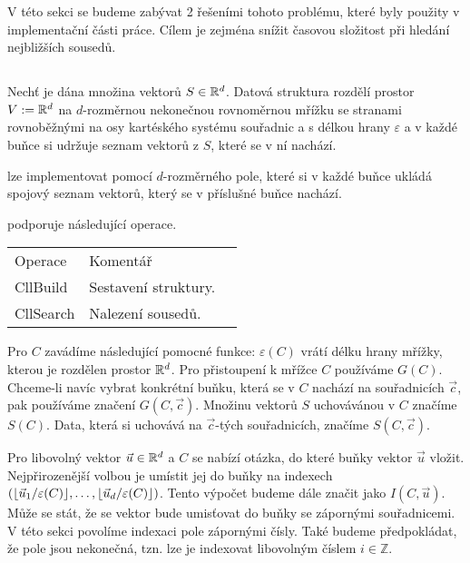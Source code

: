 V této sekci se budeme zabývat 2 řešeními tohoto problému, které byly použity v implementační části práce. Cílem je zejména snížit časovou složitost při hledání nejbližších sousedů.

\subsection{}

\label{defi:cll}
\begin{defi}
  Nechť je dána množina vektorů $S \in \mathbb{R}^d$. Datová struktura  rozdělí prostor $V := \mathbb{R}^d$ na $d$-rozměrnou nekonečnou rovnoměrnou mřížku se stranami rovnoběžnými na osy kartéského systému souřadnic a s délkou hrany $\varepsilon$ a v každé buňce si udržuje seznam vektorů z $S$, které se v ní nachází.\cite[s.~149--152]{computer_simulation_of_liquids}
\end{defi}

 lze implementovat pomocí $d$-rozměrného pole, které si v každé buňce ukládá spojový seznam vektorů, který se v příslušné buňce nachází.

\noindent {} podporuje následující operace.

\begin{table}[ht!]
  \begin{tabular}{lll}
    Operace & Komentář\\
    CllBuild & Sestavení struktury.\\
    CllSearch & Nalezení sousedů.\\
  \end{tabular}
\end{table}

Pro  $C$ zavádíme následující pomocné funkce: $\varepsilon(C)$ vrátí délku hrany mřížky, kterou je rozdělen prostor $\mathbb{R}^d$. Pro přistoupení k mřížce  $C$ používáme $G(C)$. Chceme-li navíc vybrat konkrétní buňku, která se v $C$ nachází na souřadnicích $\vec{c}$, pak používáme značení $G(C, \vec{c})$. Množinu vektorů $S$ uchovávánou v  $C$ značíme $S(C)$. Data, která si  uchovává na $\vec{c}$-tých souřadnicích, značíme $S(C, \vec{c})$.

Pro libovolný vektor $\vec{u} \in \mathbb{R}^d$ a  $C$ se nabízí otázka, do které buňky vektor $\vec{u}$ vložit. Nejpřirozenější volbou je umístit jej do buňky na indexech $(\lfloor\vec{u}_1/\varepsilon(C)\rfloor, \ldots, \lfloor\vec{u}_d/\varepsilon(C)\rfloor)$. Tento výpočet budeme dále značit jako $I(C, \vec{u})$. Může se stát, že se vektor bude umisťovat do buňky se zápornými souřadnicemi. V této sekci povolíme indexaci pole zápornými čísly. Také budeme předpokládat, že pole jsou nekonečná, tzn. lze je indexovat libovolným číslem $i \in \mathbb{Z}$.


